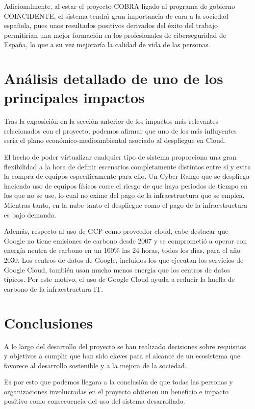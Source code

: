   Adicionalmente, al estar el proyecto COBRA ligado al programa de gobierno COINCIDENTE, el sistema tendrá gran importancia de cara a la sociedad española, pues unos resultados positivos derivados del éxito del trabajo permitirían una mejor formación en los profesionales de ciberseguridad de España, lo que a su vez mejoraría la calidad de vida de las personas.

\section*{Análisis detallado de uno de los principales impactos}
  Tras la exposición en la sección anterior de los impactos más relevantes relacionados con el proyecto, podemos afirmar que uno de los más influyentes sería el plano económico-medioambiental asociado al despliegue en Cloud. 

  El hecho de poder virtualizar cualquier tipo de sistema proporciona una gran flexibilidad a la hora de definir escenarios completamente distintos entre sí y evita la compra de equipos específicamente para ello. Un Cyber Range que se despliega haciendo uso de equipos físicos corre el riesgo de que haya periodos de tiempo en los que no se use, lo cual no exime del pago de la infraestructura que se emplea. Mientras tanto, en la nube tanto el despliegue como el pago de la infraestructura es bajo demanda.

  Además, respecto al uso de GCP como proveedor cloud, cabe destacar que Google no tiene emisiones de carbono desde 2007 y se comprometió a operar con energía neutra de carbono en un 100\% las 24 horas, todos los días, para el año 2030. Los centros de datos de Google, incluidos los que ejecutan los servicios de Google Cloud, también usan mucho menos energía que los centros de datos típicos. Por este motivo, el uso de Google Cloud ayuda a reducir la huella de carbono de la infraestructura IT.

\section*{Conclusiones}
  A lo largo del desarrollo del proyecto se han realizado decisiones sobre requisitos y objetivos a cumplir que han sido claves para el alcance de un ecosistema que favorece al desarrollo sostenible y a la mejora de la sociedad. 

  Es por esto que podemos llegara a la conclusión de que todas las personas y organizaciones involucradas en el proyecto obtienen un beneficio e impacto positivo como consecuencia del uso del sistema desarrollado. 

